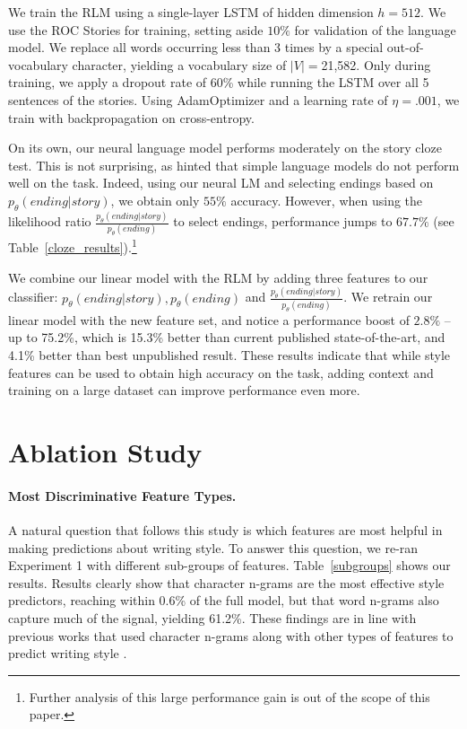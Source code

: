 \documentclass[11pt,a4paper]{article}
\newcommand{\tabref}[1]{Table~\ref{#1}}
\newcommand{\isection}[2]{\section{#1}\label{ssec:#2}}
\begin{document}
We train the RLM using a single-layer LSTM \cite{hochreiter1997long} of hidden dimension $h=512$.
We use the ROC Stories for training, setting aside $10\%$ for validation of the language model. 
We replace all words occurring less than 3 times by a special out-of-vocabulary character, yielding a vocabulary size of $|V|=$21,582.
Only during training, we apply a dropout rate of 60\% while running the LSTM over all 5 sentences of the stories. 
Using AdamOptimizer \cite{kingma2014adam} and a learning rate of $\eta=.001$, we train with backpropagation on cross-entropy. %


On its own, our neural language model performs moderately on the story cloze test. 
This is not surprising, as \citet{Mostafazadeh:2016} hinted  that simple language models do not perform well on the task. 
Indeed, using our neural LM and selecting endings based on $p_\theta(ending|story)$, we obtain only $55\%$ accuracy. 
However, when using the likelihood ratio $\frac{p_\theta(ending|story)}{p_\theta(ending)}$ to select endings, performance jumps to $67.7\%$ (see \tabref{cloze_results}).\footnote{Further analysis of this large performance gain is out of the scope of this paper.}

We combine our linear model with the RLM by adding three features to our classifier: $p_\theta(ending|story),p_\theta(ending)$ and $\frac{p_\theta(ending|story)}{p_\theta(ending)}$. 
We retrain our linear  model with the new feature set, and notice a performance   boost  of $2.8\%$ -- up to 75.2\%, which is 15.3\% better than current published state-of-the-art, and 4.1\% better than best unpublished result.
These results indicate that while style features can be used to obtain high accuracy on the task, adding context and training on a large dataset can improve performance even more.




\isection{Ablation Study}{Ablation}



\paragraph{Most Discriminative Feature Types.}
A natural question that follows this study is which features are most helpful in making predictions about writing style. 
To answer this question, we re-ran Experiment 1 with different sub-groups of features. 
\tabref{subgroups} shows our results. Results clearly show that  character n-grams are the most effective style predictors, reaching within  0.6\% of the full model, but that word n-grams also capture much of the signal, yielding 61.2\%. 
These findings are in line with previous works that used character n-grams along with other types of features to predict writing  style \cite{Schwartz:2013}.
\end{document}
